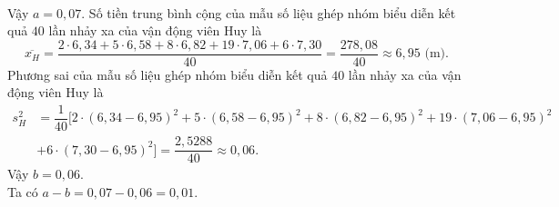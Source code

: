 \begin{ex}
{\begin{align*}
		\end{align*}
		Vậy $a = 0{,}07$.
		Số tiền trung bình cộng của mẫu số liệu ghép nhóm biểu diễn kết quả $40$ lần nhảy xa của vận động viên Huy là
		\[\overline{x_H} = \dfrac{2 \cdot 6{,}34 + 5 \cdot 6{,}58 + 8 \cdot 6{,}82 + 19 \cdot 7{,}06 + 6 \cdot 7{,}30}{40} = \dfrac{278{,}08}{40} \approx 6{,}95 \text{ (m).}\]
		Phương sai của mẫu số liệu ghép nhóm biểu diễn kết quả $40$ lần nhảy xa của vận động viên Huy là 
		\begin{align*}
		s_H^2 &= \dfrac{1}{40} \big[2 \cdot (6{,}34 - 6{,}95)^2 + 5 \cdot (6{,}58 - 6{,}95)^2 + 8 \cdot (6{,}82 - 6{,}95)^2 + 19 \cdot (7{,}06 - 6{,}95)^2\\
		& + 6 \cdot (7{,}30 - 6{,}95)^2 \big] = \dfrac{2{,}5288}{40} \approx 0{,}06.
		\end{align*}
		Vậy $b = 0{,}06$. \\
		Ta có $a - b = 0{,}07 - 0{,}06 = 0{,}01$.
	}
\end{ex}

